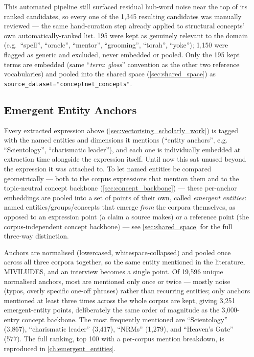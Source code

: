 This automated pipeline still surfaced residual hub-word noise near the top of its ranked candidates, so every one of the 1,345 resulting candidates was manually reviewed — the same hand-curation step already applied to structural concepts' own automatically-ranked list. 195 were kept as genuinely relevant to the domain (e.g.\ \enquote{spell}, \enquote{oracle}, \enquote{mentor}, \enquote{grooming}, \enquote{torah}, \enquote{yoke}); 1,150 were flagged as generic and excluded, never embedded or pooled. Only the 195 kept terms are embedded (same \enquote{\textit{term}: \textit{gloss}} convention as the other two reference vocabularies) and pooled into the shared space (\ref{sec:shared_space}) as \texttt{source\_dataset="conceptnet\_concepts"}.

\subsection{Emergent Entity Anchors}\label{sec:emergent_entities}
Every extracted expression above (\ref{sec:vectorising_scholarly_work}) is tagged with the named entities and dimensions it mentions (\enquote{entity anchors}, e.g. \enquote{Scientology}, \enquote{charismatic leader}), and each one is individually embedded at extraction time alongside the expression itself. Until now this sat unused beyond the expression it was attached to. To let named entities be compared geometrically — both to the corpus expressions that mention them and to the topic-neutral concept backbone (\ref{sec:concept_backbone}) — these per-anchor embeddings are pooled into a set of points of their own, called \textit{emergent entities}: named entities/groups/concepts that emerge \textit{from} the corpora themselves, as opposed to an expression point (a claim a source makes) or a reference point (the corpus-independent concept backbone) — see \ref{sec:shared_space} for the full three-way distinction.

Anchors are normalised (lowercased, whitespace-collapsed) and pooled once across all three corpora together, so the same entity mentioned in the literature, MIVILUDES, and an interview becomes a single point. Of 19{,}596 unique normalised anchors, most are mentioned only once or twice — mostly noise (typos, overly specific one-off phrases) rather than recurring entities; only anchors mentioned at least three times across the whole corpus are kept, giving 3{,}251 emergent-entity points, deliberately the same order of magnitude as the 3{,}000-entry concept backbone. The most frequently mentioned are \enquote{Scientology} (3{,}867), \enquote{charismatic leader} (3{,}417), \enquote{NRMs} (1{,}279), and \enquote{Heaven's Gate} (577). The full ranking, top 100 with a per-corpus mention breakdown, is reproduced in \ref{ch:emergent_entities}.

